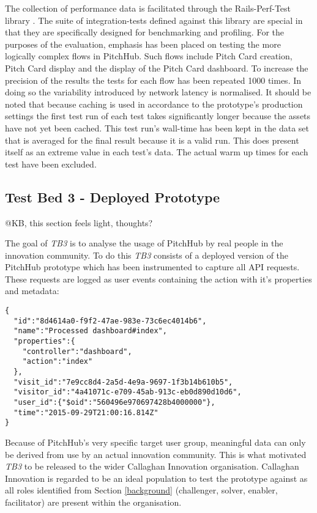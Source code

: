 The collection of performance data is facilitated through the Rails-Perf-Test library \cite{railsperftest:online}. The suite of integration-tests defined against this library are special in that they are specifically designed for benchmarking and profiling. For the purposes of the evaluation, emphasis has been placed on testing the more logically complex flows in PitchHub. Such flows include Pitch Card creation, Pitch Card display and the display of the Pitch Card dashboard. To increase the precision of the results the tests for each flow has been repeated 1000 times. In doing so the variability introduced by network latency is normalised. It should be noted that because caching is used in accordance to the prototype's production settings the first test run of each test takes significantly longer because the assets have not yet been cached. This test run's wall-time has been kept in the data set that is averaged for the final result because it is a valid run. This does present itself as an extreme value in each test's data. The actual warm up times for each test have been excluded.

\subsection{Test Bed 3 - Deployed Prototype}\label{SS:deployedPrototype}
@KB, this section feels light, thoughts?

The goal of \textit{TB3} is to analyse the usage of PitchHub by real people in the innovation community. To do this \textit{TB3} consists of a deployed version of the PitchHub prototype which has been instrumented to capture all API requests. These requests are logged as user events containing the action with it's properties and metadata: 

\begin{verbatim}
{
  "id":"8d4614a0-f9f2-47ae-983e-73c6ec4014b6",
  "name":"Processed dashboard#index",
  "properties":{
    "controller":"dashboard",
    "action":"index"
  },
  "visit_id":"7e9cc8d4-2a5d-4e9a-9697-1f3b14b610b5",
  "visitor_id":"4a41071c-e709-45ab-913c-eb0d890d10d6",
  "user_id":{"$oid":"560496e970697428b4000000"},
  "time":"2015-09-29T21:00:16.814Z"
}
\end{verbatim}

Because of PitchHub's very specific target user group, meaningful data can only be derived from use by an actual innovation community. This is what motivated \textit{TB3} to be released to the wider Callaghan Innovation organisation. Callaghan Innovation is regarded to be an ideal population to test the prototype against as all roles identified from Section \ref{background} (challenger, solver, enabler, facilitator) are present within the organisation.